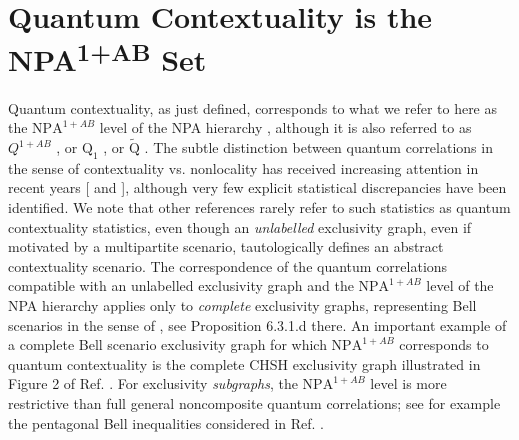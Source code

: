 \documentclass[
  12pt          %
  ,letterpaper  %
  ,center       %
  ,noupper      %
  ,english,fleqn]{uconnthesis}
\let\stdsection\section
\renewcommand\section{\newpage\stdsection}
\begin{document}
\section{Quantum Contextuality is the NPA\textsuperscript{1+AB} Set}\label{sec:q1ab}
Quantum contextuality, as just defined, corresponds to what we refer to here as the $\mbox{NPA}^{1+AB}$ level of the NPA hierarchy \cite{FritzCombinatorialLong,NPA2007Short,NPA2008Long}, although it is also referred to as ${{Q}^{1+AB}}$ \cite{ConsistentHistoriesContextuality}, or  $\mbox{Q}_1$ \cite{FritzCombinatorialLong}, or $\tilde{\mbox{Q}}$ \cite{AlmostQuantum2}. The subtle distinction between quantum correlations in the sense of contextuality vs. nonlocality has received increasing attention in recent years [\citealp{FritzCombinatorialLong,AlmostQuantum2,CabelloMultigraph} and \citealp[Eq. (20)]{NonlocalityContextualityCommutativity}], although very few explicit statistical discrepancies have been identified. We note that other references rarely refer to such statistics as quantum contextuality statistics, even though an \emph{unlabelled} exclusivity graph, even if motivated by a multipartite scenario, tautologically defines an abstract contextuality scenario. The correspondence of the quantum correlations compatible with an unlabelled exclusivity graph and the $\mbox{NPA}^{1+AB}$ level of the NPA hierarchy applies only to \emph{complete} exclusivity graphs, representing Bell scenarios in the sense of \citet{FritzCombinatorialLong}, see Proposition 6.3.1.d there. An important example of a complete Bell scenario exclusivity graph for which $\mbox{NPA}^{1+AB}$ corresponds to quantum contextuality is the complete CHSH exclusivity graph illustrated in Figure 2 of Ref. \cite{LOExploring}. For exclusivity \emph{subgraphs}, the $\mbox{NPA}^{1+AB}$ level is more restrictive than full general noncomposite quantum correlations; see for example the pentagonal Bell inequalities considered in Ref. \cite{CabelloMultigraph}.
\end{document}

